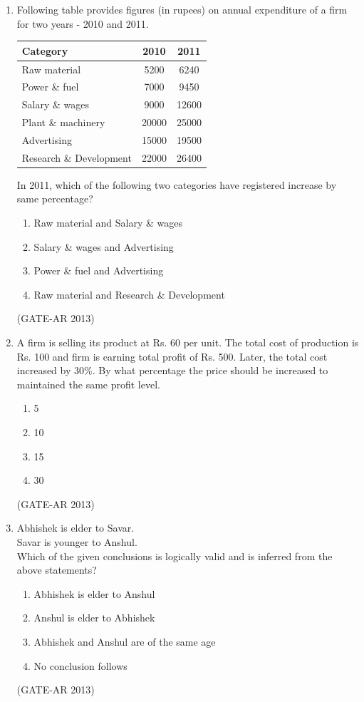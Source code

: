 \documentclass[a4paper,10pt]{article}
\begin{document}
\begin{enumerate}
    \item Following table provides figures (in rupees) on annual expenditure of a firm for two years - 2010 and 2011. \\
    \begin{center}
	\begin{tabular}{ | l | c | c | }
	\hline
	\textbf{Category} & \textbf{2010} & \textbf{2011} \\
	\hline
	Raw material & 5200 & 6240 \\
	\hline
	Power \& fuel & 7000 & 9450 \\
	\hline
	Salary \& wages & 9000 & 12600 \\
	\hline
	Plant \& machinery & 20000 & 25000 \\
	\hline
	Advertising & 15000 & 19500 \\
	\hline
	Research \& Development & 22000 & 26400 \\
	\hline
	\end{tabular}
	\end{center}
    In 2011, which of the following two categories have registered increase by same percentage?
    \begin{enumerate}
        \item Raw material and Salary \& wages
        \item Salary \& wages and Advertising
        \item Power \& fuel and Advertising
        \item Raw material and Research \& Development
    \end{enumerate}
    \hfill (GATE-AR 2013)

    \item A firm is selling its product at Rs. 60 per unit. The total cost of production is Rs. 100 and firm is earning total profit of Rs. 500. Later, the total cost increased by 30\%. By what percentage the price should be increased to maintained the same profit level.
    \begin{multicols}{4}
	\begin{enumerate}
        \item 5
        \item 10
        \item 15
        \item 30
    \end{enumerate}
	\end{multicols}
    \hfill (GATE-AR 2013)

    \item Abhishek is elder to Savar. \\
    Savar is younger to Anshul. \\
    Which of the given conclusions is logically valid and is inferred from the above statements?
    \begin{enumerate}
        \item Abhishek is elder to Anshul
        \item Anshul is elder to Abhishek
        \item Abhishek and Anshul are of the same age
        \item No conclusion follows
    \end{enumerate}
    \hfill (GATE-AR 2013)


\end{enumerate}
\end{document}

